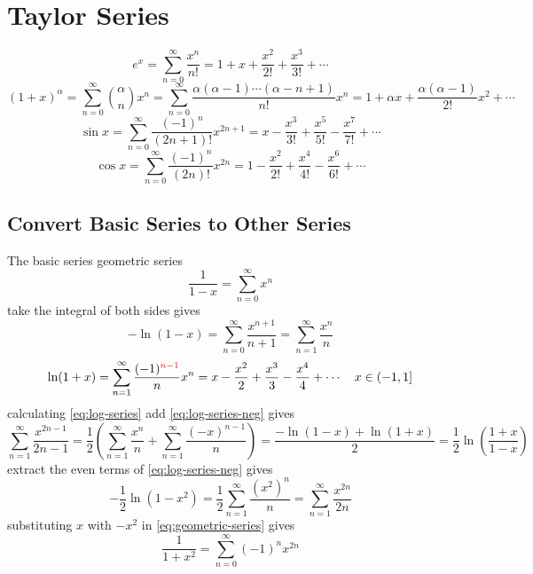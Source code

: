 \documentclass{overview}
\begin{document}
\section{Taylor Series}

\[
	e^x = \sum_{n=0}^{\infty} \frac{x^n}{n!} 
	= 1 + x + \frac{x^2}{2!} + \frac{x^3}{3!} + \cdots
\] 
\[
	(1+x)^{\alpha} = \sum_{n=0}^{\infty} \binom{\alpha}{n} x^n
	= \sum_{n=0}^{\infty} \frac{\alpha(\alpha-1)\cdots(\alpha-n+1)}{n!} x^n
	= 1 + \alpha x + \frac{\alpha(\alpha-1)}{2!} x^2 + \cdots
\] 
\[
	\sin x = \sum_{n=0}^{\infty} \frac{(-1)^n}{(2n+1)!} x^{2n+1}
	= x - \frac{x^3}{3!} + \frac{x^5}{5!} - \frac{x^7}{7!} + \cdots
\] 
\[
	\cos x = \sum_{n=0}^{\infty} \frac{(-1)^n}{(2n)!} x^{2n}
	= 1 - \frac{x^2}{2!} + \frac{x^4}{4!} - \frac{x^6}{6!} + \cdots
\] 
\subsection{Convert Basic Series to Other Series}
The basic series geometric series
\begin{equation}\label{eq:geometric-series}
	\frac{1}{1-x} = \sum_{n=0}^{\infty} x^n
\end{equation}
take the integral of both sides gives
\begin{equation} \label{eq:log-series-neg}
	-\ln(1-x) = \sum_{n=0}^{\infty} \frac{x^{n+1}}{n+1} =
 \sum_{n=1}^{\infty} \frac{x^n}{n}
\end{equation}
\begin{equation} \label{eq:log-series}
	\ln(1+x) = \sum_{n=1}^{\infty} \frac{(-1)^{\textcolor{red}{n-1}}}{n} x^n
	= x - \frac{x^2}{2} + \frac{x^3}{3} - \frac{x^4}{4} + \cdots
	\quad x \in (-1,1]
\end{equation}
calculating \eqref{eq:log-series} add \eqref{eq:log-series-neg} gives
\begin{equation}
	\sum_{n=1}^{\infty} \frac{x^{2n-1}}{2n-1} = \frac{1}{2}\left(
		\sum_{n=1}^{\infty} \frac{x^n}{n} + \sum_{n=1}^{\infty} \frac{(-x)^{n-1}}{n}
	\right) 
	= \frac{-\ln(1-x) + \ln(1+x)}{2}
	= \frac{1}{2} \ln\left(\frac{1+x}{1-x}\right)
\end{equation}
extract the even terms of \eqref{eq:log-series-neg} gives
\begin{equation}
	-\frac{1}{2} \ln(1-x^2) =
	\frac{1}{2} \sum_{n=1}^{\infty} \frac{(x^2)^n}{n}
	= \sum_{n=1}^{\infty} \frac{x^{2n}}{2n}
\end{equation}
substituting $x$ with $-x^2$ in \eqref{eq:geometric-series} gives
\begin{equation}
	\frac{1}{1+x^2} = \sum_{n=0}^{\infty} (-1)^n x^{2n}
\end{equation}
\end{document}
